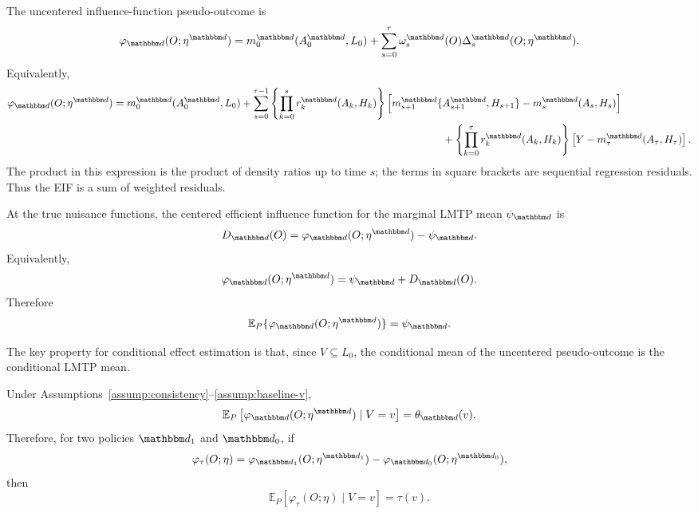 \documentclass[11pt]{article}
\begin{document}
The uncentered influence-function pseudo-outcome is
\[
  \varphi_{\mathbbm d}(O;\eta^{\mathbbm d})
  =
  m_0^{\mathbbm d}(A_0^{\mathbbm d},L_0)
  +
  \sum_{s=0}^{\tau}
  \omega_s^{\mathbbm d}(O)
  \Delta_s^{\mathbbm d}(O;\eta^{\mathbbm d}).
\]
Equivalently,
\begin{align*}
  \varphi_{\mathbbm d}(O;\eta^{\mathbbm d})
  =
  m_0^{\mathbbm d}(A_0^{\mathbbm d},L_0)
 +
  \sum_{s=0}^{\tau-1}
  \left\{
    \prod_{k=0}^{s}
    r_k^{\mathbbm d}(A_k,H_k)
  \right\}
  \Big[
    m_{s+1}^{\mathbbm d}
    \{ & A_{s+1}^{\mathbbm d},H_{s+1}\}
    -
    m_s^{\mathbbm d}(A_s,H_s)
  \Big] \\ 
  & +
  \left\{
    \prod_{k=0}^{\tau}
    r_k^{\mathbbm d}(A_k,H_k)
  \right\}
  \left[
    Y - m_\tau^{\mathbbm d}(A_\tau,H_\tau)
  \right].
\end{align*}
The product in this expression is the product of density ratios up to time \(s\);
the terms in square brackets are sequential regression residuals. Thus the EIF
is a sum of weighted residuals.

At the true nuisance functions, the centered efficient influence function for
the marginal LMTP mean \(\psi_{\mathbbm d}\) is
\[
  D_{\mathbbm d}(O)
  =
  \varphi_{\mathbbm d}(O;\eta^{\mathbbm d})
  -
  \psi_{\mathbbm d}.
\]
Equivalently,
\[
  \varphi_{\mathbbm d}(O;\eta^{\mathbbm d})
  =
  \psi_{\mathbbm d}
  +
  D_{\mathbbm d}(O).
\]
Therefore
\[
  \mathbb{E}_{P}
  \{
    \varphi_{\mathbbm d}(O;\eta^{\mathbbm d})
  \}
  =
  \psi_{\mathbbm d}.
\]

The key property for conditional effect estimation is that, since
\(V\subseteq L_0\), the conditional mean of the uncentered pseudo-outcome is the
conditional LMTP mean.

\begin{theorem}
\label{thm:pseudooutcome-identification}
Under Assumptions~\ref{assump:consistency}--\ref{assump:baseline-v},
\[
  \mathbb{E}_{P}
  \left[
    \varphi_{\mathbbm d}(O;\eta^{\mathbbm d})
    \mid V=v
  \right]
  =
  \theta_{\mathbbm d}(v).
\]
Therefore, for two policies \(\mathbbm d_1\) and \(\mathbbm d_0\), if
\[
  \varphi_{\tau}(O;\eta)
  =
  \varphi_{\mathbbm d_1}(O;\eta^{\mathbbm d_1})
  -
  \varphi_{\mathbbm d_0}(O;\eta^{\mathbbm d_0}),
\]
then
\[
  \mathbb{E}_{P}
  \left[
    \varphi_{\tau}(O;\eta)
    \mid V=v
  \right]
  =
  \tau(v).
\]
\end{theorem}
\end{document}
